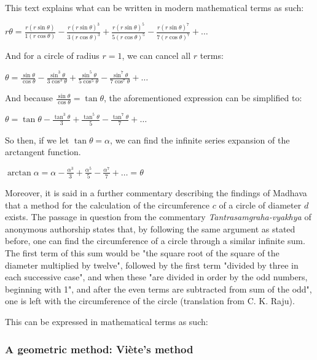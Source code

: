 This text explains what can be written in modern mathematical terms as such:

$r \theta = \frac{r (r \sin{\theta})}{1 (r \cos{\theta})} - \frac{r (r \sin{\theta})^3}{3 (r \cos{\theta})^3} + \frac{r (r \sin{\theta})^5}{5 (r \cos{\theta})^5} - \frac{r (r \sin{\theta})^7}{7 (r \cos{\theta})^7} + \dots$

And for a circle of radius $r = 1$, we can cancel all $r$ terms:

$\theta = \frac{\sin{\theta}}{\cos{\theta}} - \frac{\sin^3{\theta}}{3 \cos^3{\theta}} + \frac{\sin^5{\theta}}{5 \cos^5{\theta}} - \frac{\sin^7{\theta}}{7 \cos^7{\theta}} + \dots$

And because $\frac{\sin{\theta}}{\cos{\theta}} = \tan{\theta}$, the aforementioned expression 
can be simplified to: 

$\theta = \tan{\theta} - \frac{\tan^3{\theta}}{3} + \frac{\tan^5{\theta}}{5} - \frac{\tan^7{\theta}}{7} + \dots$

So then, if we let $\tan{\theta} = \alpha$, we can find the infinite series expansion 
of the arctangent function. 

$\arctan{\alpha} = \alpha - \frac{\alpha^3}{3} + \frac{\alpha^5}{5} - \frac{\alpha^7}{7} + \dots = \theta$

Moreover, it is said in a further commentary describing the findings of Madhava that a  
method for the calculation of the circumference $c$ of a circle of diameter $d$ exists. 
The passage in question from the commentary \textit{Tantrasamgraha-vyakhya} of 
anonymous authorship states that, by following the same argument as stated before, one 
can find the circumference of a circle through a similar infinite sum. The first 
term of this sum would be "the square root of the square of the diameter multiplied by 
twelve", followed by the first term "divided by three in each successive case", and 
when these "are divided in order by the odd numbers, beginning with 1", and after the 
even terms are subtracted from sum of the odd", one is left with the circumference of the 
circle (translation from C. K. Raju). \cite{raju_2007} 

This can be expressed in mathematical terms as such: 





\subsubsection{A geometric method: Viète's method}

